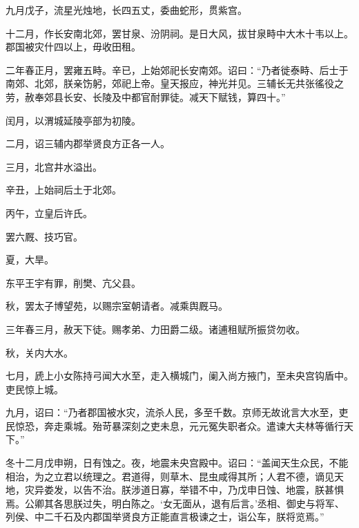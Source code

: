 \documentclass[12pt,UTF8]{ctexbook}
\begin{document}
九月戊子，流星光烛地，长四五丈，委曲蛇形，贯紫宫。



十二月，作长安南北郊，罢甘泉、汾阴祠。是日大风，拔甘泉畤中大木十韦以上。郡国被灾什四以上，毋收田租。



二年春正月，罢雍五畤。辛已，上始郊祀长安南郊。诏曰：“乃者徙泰畤、后士于南郊、北郊，朕亲饬躬，郊祀上帝。皇天报应，神光并见。三辅长无共张徭役之劳，赦奉郊县长安、长陵及中都官耐罪徒。减天下赋钱，算四十。”



闰月，以渭城延陵亭部为初陵。



二月，诏三辅内郡举贤良方正各一人。



三月，北宫井水溢出。



辛丑，上始祠后土于北郊。



丙午，立皇后许氏。



罢六厩、技巧官。



夏，大旱。



东平王宇有罪，削樊、亢父县。



秋，罢太子博望苑，以赐宗室朝请者。减乘舆厩马。



三年春三月，赦天下徒。赐孝弟、力田爵二级。诸逋租赋所振贷勿收。



秋，关内大水。



七月，虒上小女陈持弓闻大水至，走入横城门，阑入尚方掖门，至未央宫钩盾中。吏民惊上城。



九月，诏曰：“乃者郡国被水灾，流杀人民，多至千数。京师无故讹言大水至，吏民惊恐，奔走乘城。殆苛暴深刻之吏未息，元元冤失职者众。遣谏大夫林等循行天下。”



冬十二月戊申朔，日有蚀之。夜，地震未央宫殿中。诏曰：“盖闻天生众民，不能相治，为之立君以统理之。君道得，则草木、昆虫咸得其所；人君不德，谪见天地，灾异娄发，以告不治。朕涉道日寡，举错不中，乃戊申日蚀、地震，朕甚惧焉。公卿其各思朕过失，明白陈之。‘女无面从，退有后言。’丞相、御史与将军、列侯、中二千石及内郡国举贤良方正能直言极谏之士，诣公车，朕将览焉。”
\end{document}
